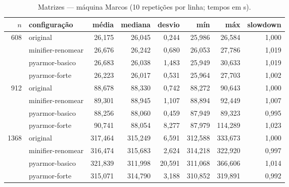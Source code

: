 \begin{table}[ht]\centering\footnotesize
\caption{Matrizes --- máquina Marcos (10 repetições por linha; tempos em s).}\label{tab:marcos-matrizes}
\begin{tabular}{rlrrrrrr}\hline
$n$ & configuração & média & mediana & desvio & mín & máx & slowdown \\\hline
608 & original & 26,175 & 26,045 & 0,244 & 25,986 & 26,584 & 1,000 \\
 & minifier-renomear & 26,676 & 26,242 & 0,680 & 26,053 & 27,786 & 1,019 \\
 & pyarmor-basico & 26,683 & 26,038 & 1,483 & 25,949 & 30,633 & 1,019 \\
 & pyarmor-forte & 26,223 & 26,017 & 0,531 & 25,964 & 27,703 & 1,002 \\
\hline
912 & original & 88,678 & 88,330 & 0,742 & 88,272 & 90,643 & 1,000 \\
 & minifier-renomear & 89,301 & 88,945 & 1,107 & 88,894 & 92,449 & 1,007 \\
 & pyarmor-basico & 88,256 & 88,060 & 0,459 & 87,949 & 89,323 & 0,995 \\
 & pyarmor-forte & 90,741 & 88,054 & 8,277 & 87,979 & 114,289 & 1,023 \\
\hline
1368 & original & 317,464 & 315,249 & 6,591 & 312,588 & 333,673 & 1,000 \\
 & minifier-renomear & 316,474 & 315,683 & 2,624 & 314,218 & 322,920 & 0,997 \\
 & pyarmor-basico & 321,839 & 311,998 & 20,591 & 311,068 & 366,606 & 1,014 \\
 & pyarmor-forte & 315,071 & 314,790 & 3,188 & 310,852 & 319,891 & 0,992 \\
\hline
\end{tabular}\end{table}

